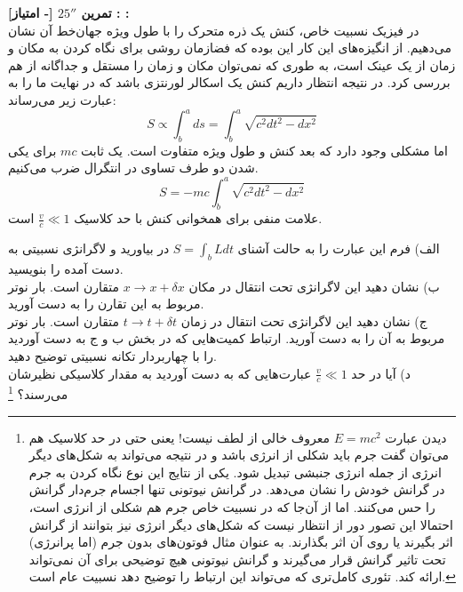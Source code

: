 \documentclass{article}
\newenvironment{parind}{%
	\par%
	\leftskip=0mm\rightskip=7mm
	\noindent\ignorespaces}{%
	\par}
\newenvironment{exercise}[3][\unskip]{%
	\par
	\noindent
	\textbf{تمرین
		#1
		[- امتیاز] 
		\def\temp{#3}\ifx\temp\empty
		: 
		\else
		: #3 \vspace{0.5em} \\ \noindent
		\fi
}}{}
\begin{document}
	
	\begin{exercise}[$25''$]{20}{}
	در فیزیک نسبیت خاص،‌ کنش یک ذره متحرک را با طول ویژه جهان‌خط آن نشان می‌دهیم. از انگیزه‌های این کار این بوده که فضا‌زمان روشی برای نگاه کردن به مکان و زمان از یک عینک است،‌ به طوری که نمی‌توان مکان و زمان را مستقل و جداگانه از هم بررسی کرد. در نتیجه انتظار داریم کنش یک اسکالر لورنتزی باشد که در نهایت ما را به عبارت زیر می‌رساند:
	\begin{equation*}
	    S \propto \int_{b}^{a}ds = \int_{b}^{a}\sqrt{c^2 dt^2-dx^2}
	\end{equation*}
	اما مشکلی وجود دارد که بعد کنش و طول ویژه متفاوت است. یک ثابت 
	$mc$ 
	برای یکی شدن دو طرف تساوی در انتگرال ضرب می‌کنیم.
		\begin{equation*}
	    S = -mc\int_{b}^{a}\sqrt{c^2 dt^2-dx^2}
	\end{equation*}
	علامت منفی برای همخوانی کنش با حد کلاسیک 
	$\frac{v}{c}\ll1$ 
	است.
	\begin{parind}
	
	الف)‌ فرم این عبارت را به حالت آشنای 
	$S = \int_{b}L dt$ 
	در بیاورید و لاگرانژی نسبیتی به دست آمده را بنویسید. \\
	ب) نشان دهید این لاگرانژی تحت انتقال در مکان 
	$x \to x+\delta x$ 
	متقارن است.  بار نوتر مربوط به این تقارن را به دست آورید. \\
	ج) نشان دهید این لاگرانژی تحت انتقال در زمان 
	$t \to t+\delta t$ 
	متقارن است. بار نوتر مربوط به آن را به دست آورید. ارتباط کمیت‌هایی که در بخش ب و ج به دست آوردید را با چهاربردار تکانه نسبیتی توضیح دهید. \\
	د) آیا در حد 
	$\frac{v}{c}\ll1$ 
	عبارت‌هایی که به دست آوردید به مقدار کلاسیکی نظیرشان می‌رسند؟ 
	\footnote{
	دیدن عبارت 
	$E=mc^2$ معروف خالی از لطف نیست! 
		یعنی حتی در حد کلاسیک هم می‌توان گفت جرم باید شکلی از انرژی باشد و در نتیجه می‌تواند به شکل‌های دیگر انرژی از جمله انرژی جنبشی تبدیل شود. یکی از نتایج این نوع نگاه کردن به جرم در گرانش خودش را نشان می‌دهد. در گرانش نیوتونی تنها اجسام جرم‌دار گرانش را حس می‌کنند. اما از آن‌جا که در نسبیت خاص جرم هم شکلی از انرژی است، احتمالا این تصور دور از انتظار نیست که شکل‌های دیگر انرژی نیز بتوانند از گرانش اثر بگیرند یا روی آن اثر بگذارند. به عنوان مثال فوتون‌های بدون جرم (اما پرانرژی) تحت تاثیر گرانش قرار می‌گیرند و گرانش نیوتونی هیچ توضیحی برای آن نمی‌تواند ارائه کند. تئوری کامل‌تری که می‌تواند این ارتباط را توضیح دهد نسبیت عام است.
	}
\end{parind}
	\end{exercise}
	
\end{document}
